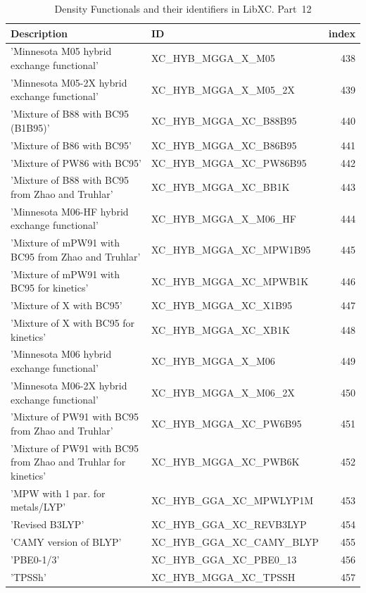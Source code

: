 \documentclass[final,12pt,makeidx,DIV=calc]{article}
\begin{document}
{{{\begin{table}[!h]
\caption{Density Functionals and their identifiers in LibXC. Part~12}
\begin{center}
\begin{tabular}{llr}
\hline
\hline
Description & ID & index\\
\hline
  'Minnesota M05 hybrid exchange functional' & XC\_HYB\_MGGA\_X\_M05  &438\\
  'Minnesota M05-2X hybrid exchange functional' & XC\_HYB\_MGGA\_X\_M05\_2X  &439\\
  'Mixture of B88 with BC95 (B1B95)' & XC\_HYB\_MGGA\_XC\_B88B95  &440\\
  'Mixture of B86 with BC95' & XC\_HYB\_MGGA\_XC\_B86B95  &441\\
  'Mixture of PW86 with BC95' & XC\_HYB\_MGGA\_XC\_PW86B95  &442\\
  'Mixture of B88 with BC95 from Zhao and Truhlar' & XC\_HYB\_MGGA\_XC\_BB1K  &443\\
  'Minnesota M06-HF hybrid exchange functional' & XC\_HYB\_MGGA\_X\_M06\_HF  &444\\
  'Mixture of mPW91 with BC95 from Zhao and Truhlar' & XC\_HYB\_MGGA\_XC\_MPW1B95  &445\\
  'Mixture of mPW91 with BC95 for kinetics' & XC\_HYB\_MGGA\_XC\_MPWB1K  &446\\
  'Mixture of X with BC95' & XC\_HYB\_MGGA\_XC\_X1B95  &447\\
  'Mixture of X with BC95 for kinetics' & XC\_HYB\_MGGA\_XC\_XB1K  &448\\
  'Minnesota M06 hybrid exchange functional' & XC\_HYB\_MGGA\_X\_M06  &449\\
  'Minnesota M06-2X hybrid exchange functional' & XC\_HYB\_MGGA\_X\_M06\_2X  &450\\
  'Mixture of PW91 with BC95 from Zhao and Truhlar' & XC\_HYB\_MGGA\_XC\_PW6B95  &451\\
  'Mixture of PW91 with BC95 from Zhao and Truhlar for kinetics' & XC\_HYB\_MGGA\_XC\_PWB6K  &452\\
  'MPW with 1 par. for metals/LYP' & XC\_HYB\_GGA\_XC\_MPWLYP1M  &453\\
  'Revised B3LYP' & XC\_HYB\_GGA\_XC\_REVB3LYP  &454\\
  'CAMY version of BLYP' & XC\_HYB\_GGA\_XC\_CAMY\_BLYP  &455\\
  'PBE0-1/3' & XC\_HYB\_GGA\_XC\_PBE0\_13  &456\\
  'TPSSh' & XC\_HYB\_MGGA\_XC\_TPSSH  &457\\

\end{tabular}
\end{center}
\end{table}}}}
\end{document}
